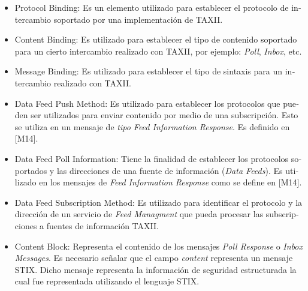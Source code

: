 \documentclass[11pt]{article}
\begin{document}
\bigskip


\bigskip


\bigskip

\begin{itemize}
\item \foreignlanguage{spanish}{Protocol Binding: Es un elemento utilizado para establecer el protocolo de intercambio
soportado por una implementación de TAXII.}
\item \foreignlanguage{spanish}{Content Binding: Es utilizado para establecer el tipo de contenido soportado para un
cierto intercambio realizado con TAXII, por ejemplo:
}\foreignlanguage{spanish}{\textit{Poll}}\foreignlanguage{spanish}{,
}\foreignlanguage{spanish}{\textit{Inbox}}\foreignlanguage{spanish}{, etc.}
\item \foreignlanguage{spanish}{Message Binding: Es utilizado para establecer el tipo de sintaxis para un intercambio
realizado con TAXII.}
\item \foreignlanguage{spanish}{Data Feed Push Method: Es utilizado para establecer los protocolos que pueden ser
utilizados para enviar contenido por medio de una subscripción. Esto se utiliza en un mensaje de
}\foreignlanguage{spanish}{\textit{tipo Feed Information Response}}\foreignlanguage{spanish}{. Es definido en [M14].}
\item \foreignlanguage{spanish}{Data Feed Poll Information: Tiene la finalidad de establecer los protocolos soportados y
las direcciones de una fuente de información (}\foreignlanguage{spanish}{\textit{Data
Feeds}}\foreignlanguage{spanish}{). Es utilizado en los mensajes de }\foreignlanguage{spanish}{\textit{Feed Information
Response}}\foreignlanguage{spanish}{ como se define en [M14].}
\item \foreignlanguage{spanish}{Data Feed Subscription Method: Es utilizado para identificar el protocolo y la dirección
de un servicio de }\foreignlanguage{spanish}{\textit{Feed Managment}}\foreignlanguage{spanish}{ que pueda procesar las
subscripciones a fuentes de información TAXII.}
\item \foreignlanguage{spanish}{Content Block: Representa el contenido de los mensajes
}\foreignlanguage{spanish}{\textit{Poll Response }}\foreignlanguage{spanish}{o }\foreignlanguage{spanish}{\textit{Inbox
Messages}}\foreignlanguage{spanish}{. Es necesario señalar que el campo
}\foreignlanguage{spanish}{\textit{content}}\foreignlanguage{spanish}{ representa un mensaje STIX. Dicho mensaje
representa la información de seguridad estructurada la cual fue representada utilizando el lenguaje STIX.}

\end{itemize}
\end{document}
